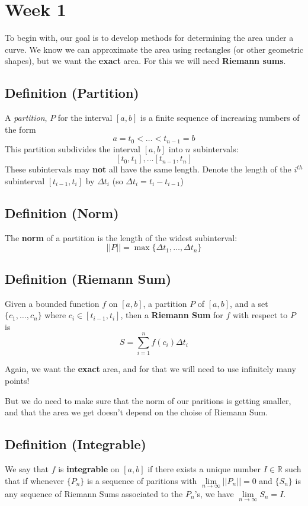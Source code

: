 \section{Week 1}
To begin with, our goal is to develop methods for determining the area under a curve.
We know we can approximate the area using rectangles (or other geometric shapes), but
we want the \textbf{exact} area. For this we will need \textbf{Riemann sums}.

\subsection{Definition (Partition)}
A \emph{partition}, $P$ for the interval $ [a,b] $ is a finite sequence of increasing
numbers of the form
\[ a=t_0<\dots <t_{n-1}=b \]
This partition subdivides the interval $ [a,b] $ into $ n $ subintervals:
\[ [t_0,t_1],\ldots [t_{n-1},t_n] \]
These subintervals may \textbf{not} all have the same length.
Denote the length of the $ i^{th} $ subinterval $ [t_{i-1},t_i] $ by $ \Delta t_i $
(so $ \Delta t_i=t_i-t_{i-1} $)

\subsection{Definition (Norm)}
The \textbf{norm} of a partition is the length of the widest subinterval:
\[ ||P||=\max\{\Delta t_1,\dots,\Delta t_{n}\} \]

\subsection{Definition (Riemann Sum)}
Given a bounded function $ f $ on $ [a,b] $, a partition $ P $ of $ [a,b] $, and a set
$ \{c_1,\dots,c_n\} $ where $ c_i\in[t_{i-1},t_i] $, then a \textbf{Riemann Sum} for
$f$ with respect to $ P $ is
\[ S=\sum\limits_{i=1}^{n} f(c_i)\Delta t_i \]

Again, we want the \textbf{exact} area, and for that we will need to use infinitely
many points!

But we do need to make sure that the norm of our paritions is getting smaller,
and that the area we get doesn't depend on the choise of Riemann Sum.

\subsection{Definition (Integrable)}
We say that $ f $ is \textbf{integrable} on $ [a,b] $ if there exists a unique number
$ I\in\mathbb{R} $ such that if whenever $ \{P_n\} $ is a sequence of paritions with
$ \lim\limits_{{n} \to {\infty}} ||P_n||=0 $ and $ \{S_n\} $ is any sequence of
Riemann Sums associated to the $ P_n $'s, we have $ \lim\limits_{{n} \to {\infty}} S_n=I $.

